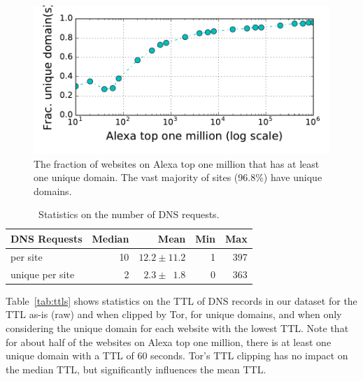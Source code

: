 \begin{figure}[t]
	\centering
	\includegraphics[width=0.7\linewidth]{figures/dns-unique-domains.pdf}
	\caption{The fraction of websites on Alexa top one million that has at least
	one unique domain. The vast majority of sites (96.8\%) have unique domains.}
	\label{fig:unique-domains}
\end{figure}

\begin{table}[t]
	\centering
	\caption{Statistics on the number of DNS requests.}
	\begin{tabular}{l r r r r}
	\toprule
	\textbf{DNS Requests} & \textbf{Median} & \textbf{Mean} & \textbf{Min} & \textbf{Max} \\
	\midrule
	per site & 10 & $12.2\pm11.2$ & 1 & 397 \\
	unique per site & 2 & $2.3\pm\phantom{0}1.8$ & 0 & 363 \\
	\bottomrule
	\end{tabular}
	\label{tab:dns-requests}
\end{table}

Table~\ref{tab:ttls} shows statistics on the TTL of DNS records in our dataset
for the TTL as-is (raw) and when clipped by Tor, for unique domains, and when
only considering the unique domain for each website with the lowest TTL.
Note that for about half of the websites on Alexa top one million, there is at
least one unique domain with a TTL of 60 seconds. Tor's TTL clipping has no
impact on the median TTL, but significantly influences the mean TTL.

